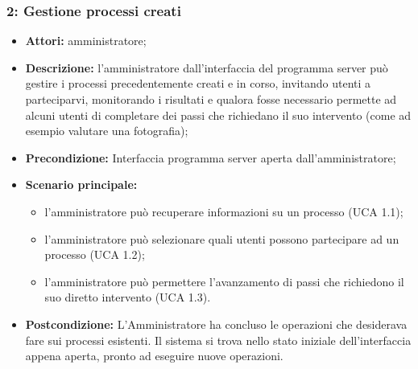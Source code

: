 \subsubsection{2: Gestione processi creati}
\begin{itemize}
\item \textbf{Attori:} 
amministratore;
\item \textbf{Descrizione:} 
l'amministratore dall'interfaccia del programma server può gestire i processi precedentemente creati e in corso, invitando utenti a parteciparvi, monitorando i risultati e qualora fosse necessario permette ad alcuni utenti di completare dei passi che richiedano il suo intervento (come ad esempio valutare una fotografia);
\item \textbf{Precondizione:} 
Interfaccia programma server aperta dall'amministratore;
\item \textbf{Scenario principale:} 
\begin{itemize}
\item l'amministratore può recuperare informazioni su un processo (UCA 1.1);
\item l'amministratore può selezionare quali utenti possono partecipare ad un processo (UCA 1.2);
\item l'amministratore può permettere l'avanzamento di passi che richiedono il suo diretto intervento (UCA 1.3).
\end{itemize}
\item \textbf{Postcondizione:} 
L'Amministratore ha concluso le operazioni che desiderava fare sui processi esistenti. Il sistema si trova nello stato iniziale dell'interfaccia appena aperta, pronto ad eseguire nuove operazioni.
\end{itemize}

